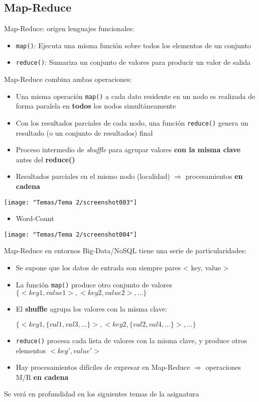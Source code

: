 \subsection{Map-Reduce}
Map-Reduce: origen lenguajes funcionales:
\begin{itemize}
\item \texttt{map()}: Ejecuta una misma función sobre todos los elementos de un conjunto
\item \texttt{reduce()}: Sumariza un conjunto de valores para producir un valor de salida
\end{itemize}
Map-Reduce combina ambas operaciones:
\begin{itemize}
\item Una misma operación \texttt{map()} a cada dato residente en un nodo es realizada de forma paralela en \textbf{todos} los nodos simultáneamente
\item Con los resultados parciales de cada nodo, una función \texttt{reduce()} genera un resultado (o un conjunto de resultados) final
\item Proceso intermedio de \textit{shuffle} para agrupar valores \textbf{con la misma clave} antes del \textbf{reduce()}
\item Resultados parciales en el mismo nodo (localidad) $\Rightarrow$ procesamientos \textbf{en cadena}
\end{itemize}
\begin{center}
	\texttt{[image: "Temas/Tema 2/screenshot003"]}
\end{center}
\begin{itemize}[label=\color{red}\textbullet, leftmargin=*]
	\item \color{lightblue}Word-Count
\end{itemize}
\begin{center}
	\texttt{[image: "Temas/Tema 2/screenshot004"]}
\end{center}
Map-Reduce en entornos Big-Data/NoSQL tiene una serie de particularidades:
\begin{itemize}
\item Se supone que los datos de entrada son siempre pares < key, value >
\item La función \texttt{map()} produce otro conjunto de valores $\{ < key1, value1 >, < key2, value2 >, \dots\}$
\item El \textbf{shuffle} agrupa los valores con la misma clave:
\begin{center}
	$\{< key1, \{val1, val3, \dots\} >, < key2, \{val2, val4, \dots\} >, \dots\}$
\end{center}
\item \texttt{reduce()} procesa cada lista de valores con la misma clave, y produce otros elementos $< key', value' >$
\item Hay procesamientos difíciles de expresar en Map-Reduce $\Rightarrow$ operaciones M/R \textbf{en cadena}
\end{itemize}
Se verá en profundidad en los siguientes temas de la asignatura

